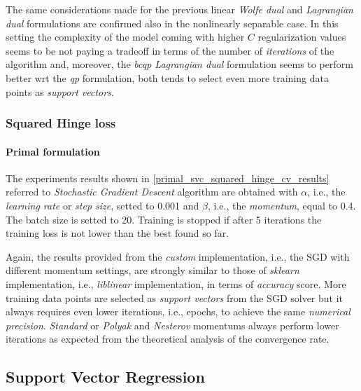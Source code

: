 



The same considerations made for the previous linear \emph{Wolfe dual} and \emph{Lagrangian dual} formulations are confirmed also in the nonlinearly separable case. In this setting the complexity of the model coming with higher $C$ regularization values seems to be not paying a tradeoff in terms of the number of \emph{iterations} of the algorithm and, moreover, the \emph{bcqp Lagrangian dual} formulation seems to perform better wrt the \emph{qp} formulation, both tends to select even more training data points as \emph{support vectors}.

\subsubsection{Squared Hinge loss}

\paragraph{Primal formulation}

The experiments results shown in \ref{primal_svc_squared_hinge_cv_results} referred to \emph{Stochastic Gradient Descent} algorithm are obtained with $\alpha$, i.e., the \emph{learning rate} or \emph{step size}, setted to 0.001 and $\beta$, i.e., the \emph{momentum}, equal to 0.4. The batch size is setted to 20. Training is stopped if after 5 iterations the training loss is not lower than the best found so far.



Again, the results provided from the \emph{custom} implementation, i.e., the SGD with different momentum settings, are strongly similar to those of \emph{sklearn} implementation, i.e., \emph{liblinear} \cite{fan2008liblinear} implementation, in terms of \emph{accuracy} score. More training data points are selected as \emph{support vectors} from the SGD solver but it always requires even lower iterations, i.e., epochs, to achieve the same \emph{numerical precision}. \emph{Standard} or \emph{Polyak} and \emph{Nesterov} momentums always perform lower iterations as expected from the theoretical analysis of the convergence rate.

\pagebreak

\subsection{Support Vector Regression}

